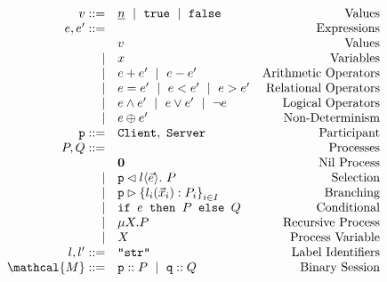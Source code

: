 \begin{prooftree}
\end{prooftree}

\begin{figure}[!hb]
\doublespacing
\[
\begin{array}{rlr}
v ::= & \underline{n}~\mid~\texttt{true}~\mid~\texttt{false} 
	& \text{Values} \\
e, e' ::= & & \text{Expressions} \\
	& v & \text{Values} \\
\mid	 & x & \text{Variables} \\
\mid & e + e'~\mid~e - e' & \text{Arithmetic Operators} \\
\mid & e = e'~\mid~e < e' ~\mid~e > e' & \text{Relational Operators} \\
\mid & e \wedge e'~\mid~e \vee e' ~\mid~\neg e & \text{Logical Operators} \\
\mid & e \oplus e' & \text{Non-Determinism} \\

\mrole{p} ::= & \mrole{Client},~\mrole{Server} & \text{Participant} \\

P,Q ::= & & \text{Processes} \\
     & \mathbf{0} & \text{Nil Process} \\
\mid & \sel{p}{l}{\vec e}.~P & \text{Selection} \\
\mid & \bra{p}{l_i(\vec x_i): P_i}{i\in I} & \text{Branching} \\
\mid & \pcond{e}{P}{Q} & \text{Conditional} \\
\mid & \precursion{P} & \text{Recursive Process} \\
\mid & \precvar & \text{Process Variable} \\

l, l' ::= & \texttt{``str''} & \text{Label Identifiers} \\

\mathcal{M} ::= & \ptprocess{p}{P} ~\mid~ \ptprocess{q}{Q} 
	& \text{Binary Session} \\
\end{array}
\]
\singlespacing
{}
\label{fig:sync}
\end{figure}

